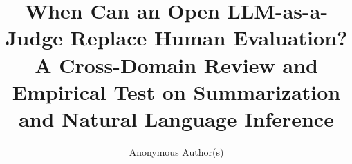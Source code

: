 \documentclass[manuscript,review,anonymous,nonacm,screen]{acmart}
\begin{document}
\title{When Can an Open LLM-as-a-Judge Replace Human Evaluation? A Cross-Domain Review and Empirical Test on Summarization and Natural Language Inference}
\author{Anonymous Author(s)}
\renewcommand{\shortauthors}{Anonymous Author(s)}
\begin{abstract}\end{abstract}
\maketitle




\end{document}
